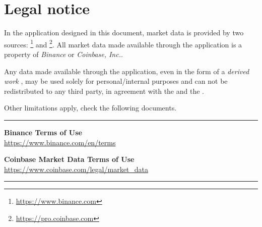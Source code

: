 \chapter{Legal notice}

In the application designed in this document, market data is provided by two
sources:
\footnote{\url{https://www.binance.com}}
and \footnote{\url{https://pro.coinbase.com}}. All market data made available
through the application is a property of \emph{Binance} or \emph{Coinbase,
Inc.}.

Any data made available through the application, even in the form of a
\emph{derived work} , may be used
solely for personal/internal purposes and can not be redistributed to any third
party, in agreement with the
 and the
.

Other limitations apply, check the following documents.

\vfill
\hrule
\vspace{10pt}
\large

\noindent\textbf{Binance Terms of Use}\\
	\indent\url{https://www.binance.com/en/terms}

\vspace{10pt}

\noindent\textbf{Coinbase Market Data Terms of Use}\\
	\indent\url{https://www.coinbase.com/legal/market_data}

\normalsize
\vspace{10pt}
\hrule
\vfill
